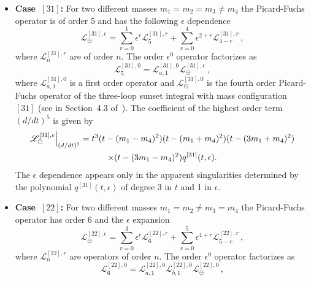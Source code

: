 \documentclass[a4paper,12pt]{article}
\numberwithin{equation}{section}
\numberwithin{figure}{section}
\def\su{\circleddash}
\begin{document}
\begin{itemize}

  \item   {\bf Case~$[31]$:} For two different masses $m_1=m_2=m_3 \neq m_4$ the
  Picard-Fuchs operator is of order 5 and has the following $\epsilon$ dependence
  \begin{equation}
    \mathscr{L}^{[31],\epsilon}_\su=       \sum_{r=0}^1 \epsilon^r
    \mathscr{L}^{[31],r}_{5}+  \sum_{r=0}^4 \epsilon^{2+r}   \mathscr{L}^{[31],r}_{4-r} \, ,
  \end{equation}
  where  $ \mathscr{L}^{[31],r}_{n}$ are of order $n$.
  The order $\epsilon^0$ operator factorizes as
  \begin{equation}
         \mathscr{L}^{[31],0}_{5}=   \mathscr{L}^{[31],0}_{a,1} \mathscr{L}^{[31],\epsilon}_\su \, , 
       \end{equation}
        where  $ \mathscr{L}^{[31],0}_{a,1}$ is a  first order operator
       and $\mathscr{L}^{[31],0}_\su$ is the fourth order
       Picard-Fuchs operator of the
       three-loop sunset integral with mass configuration $[31]$ (see 
       in Section~4.3 of~\cite{Lairez:2022zkj}).
       The coefficient of the highest order term $(d/dt)^5$    is given by
       \begin{multline}
                   \mathscr{L}^{[31],\epsilon}_\su\Big\vert_{(d/dt)^5}=
                   t^3  (t-(m_1-m_4)^2)(t-(m_1+m_4)^2)(t-(3m_1+m_4)^2) \cr\times (t-(3m_1-m_4)^2)
            q^{[31]}(t,\epsilon)      .
                 \end{multline}
                 The $\epsilon$ dependence appears only in the
                 apparent singularities determined by the polynomial
                 $q^{[31]}(t,\epsilon)$ of degree 3 in $t$ and 1 in $\epsilon$.
\item   {\bf Case~$[22]$:} For two different masses $m_1=m_2\neq m_3 = m_4$ the
  Picard-Fuchs operator has order 6 and the $\epsilon$ expansion 
  \begin{equation}
    \mathscr{L}_\su^{[22],\epsilon}=     \sum_{r=0}^3 \epsilon^r
    \mathscr{L}^{[22],r}_{6}+  \sum_{r=0}^5 \epsilon^{4+r}   \mathscr{L}^{[22],r}_{5-r} \, ,
  \end{equation}
  where  $ \mathscr{L}^{[22],r}_{n}$ are 
  operators of order $n$.
  The order $\epsilon^0$ operator factorizes as
  \begin{equation}
         \mathscr{L}^{[22],0}_{6}=   \mathscr{L}^{[22],0}_{a,1} \mathscr{L}^{[22],0}_{b,1}\mathscr{L}^{[22],0}_\su \,,
       \end{equation}

\end{itemize}
\end{document}
